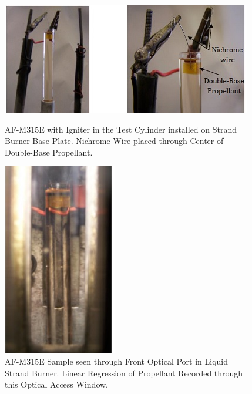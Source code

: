 \documentclass{article}
\begin{document}
\begin{figure}[htb!]
\centering
\begin{minipage}{0.5\textwidth}
\centering
\includegraphics[width=0.75\linewidth]{Figure_3.jpg}
\caption{AF-M315E with Igniter in the Test Cylinder installed on Strand Burner Base Plate. Nichrome Wire placed through Center of Double-Base Propellant.}
\label{fig3}
\end{minipage}%
\begin{minipage}{0.5\textwidth}
\centering
\includegraphics[width=0.75\linewidth]{Figure_4.jpg}
\caption{AF-M315E Sample seen through Front Optical Port in Liquid Strand Burner. Linear Regression of Propellant Recorded through this Optical Access Window.}
\label{fig4}
\end{minipage}
\end{figure}
\end{document}
